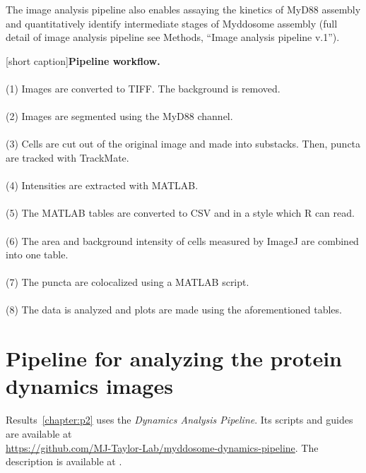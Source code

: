 The image analysis pipeline also enables assaying the kinetics of MyD88 assembly and quantitatively identify intermediate stages of Myddosome assembly (full detail of image analysis pipeline see Methods, “Image analysis pipeline v.1”).


\begin{centering}
\captionsetup{parbox=none}
[short caption]{\textbf{Pipeline workflow.}
\\
\\
(1) Images are converted to TIFF. The background is removed.
\\
\\
(2) Images are segmented using the MyD88 channel.
\\
\\
(3) Cells are cut out of the original image and made into substacks. Then, puncta are tracked with TrackMate.
\\
\\
(4) Intensities are extracted with MATLAB.
\\
\\
(5) The MATLAB tables are converted to CSV and in a style which R can read.
\\
\\
(6) The area and background intensity of cells measured by ImageJ are combined into one table.
\\
\\
(7) The puncta are colocalized using a MATLAB script.
\\
\\
(8) The data is analyzed and plots are made using the aforementioned tables.}
\label{fig:p1M}
\end{centering}

\section{Pipeline for analyzing the protein dynamics images}
\label{section:pipeline_v1}
Results~\ref{chapter:p2} uses the \emph{Dynamics Analysis Pipeline}. Its scripts and guides are available at \\ \url{https://github.com/MJ-Taylor-Lab/myddosome-dynamics-pipeline}. The description is available at \autocite{Deliz-Aguirre_2021}.

